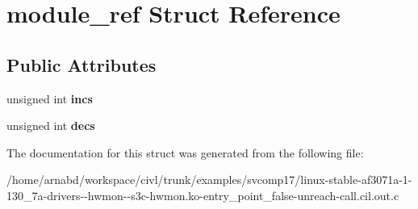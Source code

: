 \hypertarget{structmodule__ref}{}\section{module\+\_\+ref Struct Reference}
\label{structmodule__ref}
\subsection*{Public Attributes}
\begin{DoxyCompactItemize}
\item 
\hypertarget{structmodule__ref_a8b9a4bc0d9ff085c024f011094587441}{}unsigned int {\bfseries incs}\label{structmodule__ref_a8b9a4bc0d9ff085c024f011094587441}

\item 
\hypertarget{structmodule__ref_a39411733045206e3f531d50f267cd32f}{}unsigned int {\bfseries decs}\label{structmodule__ref_a39411733045206e3f531d50f267cd32f}

\end{DoxyCompactItemize}


The documentation for this struct was generated from the following file\+:\begin{DoxyCompactItemize}
\item 
/home/arnabd/workspace/civl/trunk/examples/svcomp17/linux-\/stable-\/af3071a-\/1-\/130\+\_\+7a-\/drivers-\/-\/hwmon-\/-\/s3c-\/hwmon.\+ko-\/entry\+\_\+point\+\_\+false-\/unreach-\/call.\+cil.\+out.\+c\end{DoxyCompactItemize}
